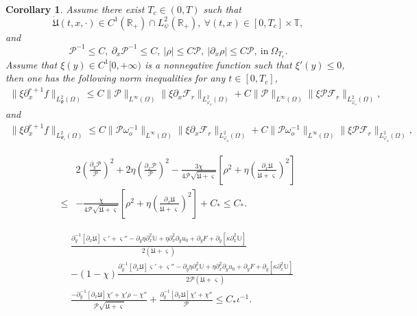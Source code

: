 \documentclass[10pt,a4paper]{amsart}
\newtheorem{corollary}{Corollary}
\begin{document}
\begin{corollary}\label{ncC3}
Assume there exist $T_{c}\in(0,T)$ such that
$$\dot{\mathfrak{U}}(t,x,\cdot)\in C^{1}(\mathbb{R}_{+})\cap L_{\psi}^{2}(\mathbb{R}_{+}),~\forall (t,x)\in[0,T_{c}]\times\mathbb{T},$$
and
$$\mathcal{P}^{-1}\leq C,~\partial_{x}\mathcal{P}^{-1}\leq C,~|\rho|\leq C\mathcal{P},~|\partial_{x}\rho|\leq C\mathcal{P},~\text{in}~ \Omega_{T_{c}}.$$
Assume that $\xi(y)\in C^{1}[0,+\infty)$ is a nonnegative function such that $\xi'(y)\leq0$, then one has the following norm inequalities for any $t\in[0,T_{c}]$,
\begin{align}\label{ncc3}
\|\xi\partial_{x}^{r+1}f\|_{L_{\Psi}^{2}(\Omega)}
\leq C\|\mathcal{P}\|_{L^{\infty}(\Omega)}\|\xi\partial_{x}\mathcal{F}_{r}\|_{L_{\varphi_{o}}^{2}(\Omega)}
    +C\|\mathcal{P}\|_{L^{\infty}(\Omega)}\|\xi\mathcal{P}\mathcal{F}_{r}\|_{L_{\varphi_{o}}^{2}(\Omega)},
\end{align}
and
\begin{align}\label{ncc3'}
\|\xi\partial_{x}^{r+1}f\|_{L_{\Psi_{c}}^{2}(\Omega)}
\leq C\|\mathcal{P}\omega_{o}^{-1}\|_{L^{\infty}(\Omega)}\|\xi\partial_{x}\mathcal{F}_{r}\|_{L_{\varphi_{o}}^{2}(\Omega)}
    +C\|\mathcal{P}\omega_{o}^{-1}\|_{L^{\infty}(\Omega)}\|\xi\mathcal{P}\mathcal{F}_{r}\|_{L_{\varphi_{o}}^{2}(\Omega)},
\end{align}

\end{corollary}

\begin{align}\label{I32}
&2\left(\frac{\partial_{y}\mathcal{P}}{\mathcal{P}}\right)^{2}
+2\eta\left(\frac{\partial_{x}\mathcal{P}}{\mathcal{P}}\right)^{2}
-\frac{3\chi}{4\mathcal{P}\sqrt{\dot{\mathfrak{U}}+\varsigma}}\left[\rho^{2}+\eta\left(\frac{\partial_{x}\dot{\mathfrak{U}}}{\dot{\mathfrak{U}}+\varsigma}\right)^{2}\right]\\
\leq&-\frac{\chi}{4\mathcal{P}\sqrt{\dot{\mathfrak{U}}+\varsigma}}\left[\rho^{2}+\eta\left(\frac{\partial_{x}\dot{\mathfrak{U}}}{\dot{\mathfrak{U}}+\varsigma}\right)^{2}\right]
     +C_{*}
\leq C_{*}.\nonumber
\end{align}

\begin{align}\label{I33}
&\frac{\partial_{y}^{-1}\left[\partial_{x}\dot{\mathfrak{U}}\right]\varsigma'+\varsigma''-\partial_{y}\eta\partial_{x}^{2}\mathbb{U}+\eta\partial_{x}^{2}\partial_{y}u_{0}+\partial_{y}F+\partial_{y}[\kappa\partial_{x}^{2}\mathbb{U}]}{2(\dot{\mathfrak{U}}+\varsigma)}\\
&-(1-\chi)\frac{\partial_{y}^{-1}\left[\partial_{x}\mathfrak{U}\right]\varsigma'+\varsigma''-\partial_{y}\eta\partial_{x}^{2}\mathbb{U}+\eta\partial_{x}^{2}\partial_{y}u_{0}+\partial_{y}F+\partial_{y}[\kappa\partial_{x}^{2}\mathbb{U}]}{2\mathcal{P}(\dot{\mathfrak{U}}+\varsigma)}\nonumber\\
&\frac{-\partial_{y}^{-1}[\partial_{x}\mathfrak{U}]\chi'+\chi'\rho-\chi''}{\mathcal{P}\sqrt{\dot{\mathfrak{U}}+\varsigma}}
+\frac{\partial_{y}^{-1}\left[\partial_{x}\mathfrak{U}\right]\chi'+\chi''}{\mathcal{P}}
\leq C_{*}\iota^{-1}.\nonumber
\end{align}
\end{document}
